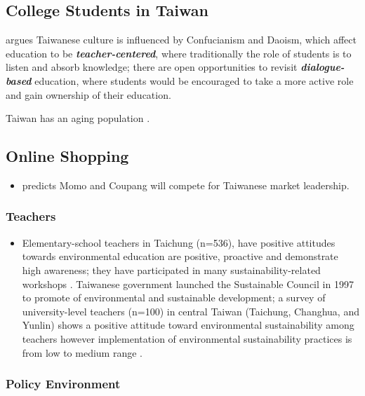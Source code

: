 \documentclass[
  letterpaper,
  DIV=11,
  numbers=noendperiod]{scrartcl}
\providecommand{\tightlist}{%
  \setlength{\itemsep}{0pt}\setlength{\parskip}{0pt}}\usepackage{longtable,booktabs,array}
\begin{document}
\subsection{College Students in
Taiwan}\label{college-students-in-taiwan}

\citep{changExploringDialogicEducation2023} argues Taiwanese culture is
influenced by Confucianism and Daoism, which affect education to be
\textbf{\emph{teacher-centered}}, where traditionally the role of
students is to listen and absorb knowledge; there are open opportunities
to revisit \textbf{\emph{dialogue-based}} education, where students
would be encouraged to take a more active role and gain ownership of
their education.

Taiwan has an aging population
\citep{gohLongrunMacroeconomicConsequences2023}.

\subsection{Online Shopping}\label{online-shopping}

\begin{itemize}
\tightlist
\item
  \citet{momovscoupang2024} predicts Momo and Coupang will compete for
  Taiwanese market leadership.
\end{itemize}

\subsubsection{Teachers}\label{teachers}

\begin{itemize}
\tightlist
\item
  Elementary-school teachers in Taichung (n=536), have positive
  attitudes towards environmental education are positive, proactive and
  demonstrate high awareness; they have participated in many
  sustainability-related workshops
  \citep{liaoElementaryTeachersEnvironmental2022}. Taiwanese government
  launched the Sustainable Council in 1997 to promote of environmental
  and sustainable development; a survey of university-level teachers
  (n=100) in central Taiwan (Taichung, Changhua, and Yunlin) shows a
  positive attitude toward environmental sustainability among teachers
  however implementation of environmental sustainability practices is
  from low to medium range \citep{FenXi2015}.
\end{itemize}

\subsubsection{Policy Environment}\label{policy-environment}
\end{document}
